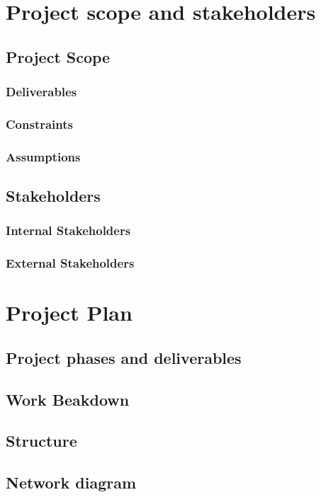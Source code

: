 \documentclass{article}
\begin{document}
  \section{Project scope and stakeholders}
  \subsection{Project Scope}
  \subsubsection{Deliverables}
  \subsubsection{Constraints}
  \subsubsection{Assumptions}
  \subsection{Stakeholders}
  \subsubsection{Internal Stakeholders}
  \subsubsection{External Stakeholders}

  \newpage
  \section{Project Plan}
  \subsection{Project phases and deliverables}
  \subsection{Work Beakdown}
  \subsection{Structure}
  \subsection{Network diagram}
\end{document}
